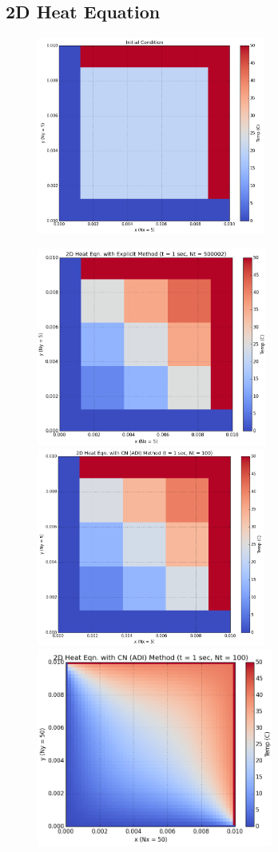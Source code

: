 \documentclass[12pt]{article}		%
\begin{document}
\subsection*{2D Heat Equation}

\begin{figure}
\centering
\includegraphics[height=6.5cm]{figure-6-2d_heat_init.png}\par\medskip
\includegraphics[height=6.5cm]{figure-7-2d_heat_exp.png}\quad
\includegraphics[height=6.5cm]{figure-8-2d_heat_adi.png}
\includegraphics[height=6.5cm]{figure-10-2d_heat50.png}

\end{figure}
\end{document}
